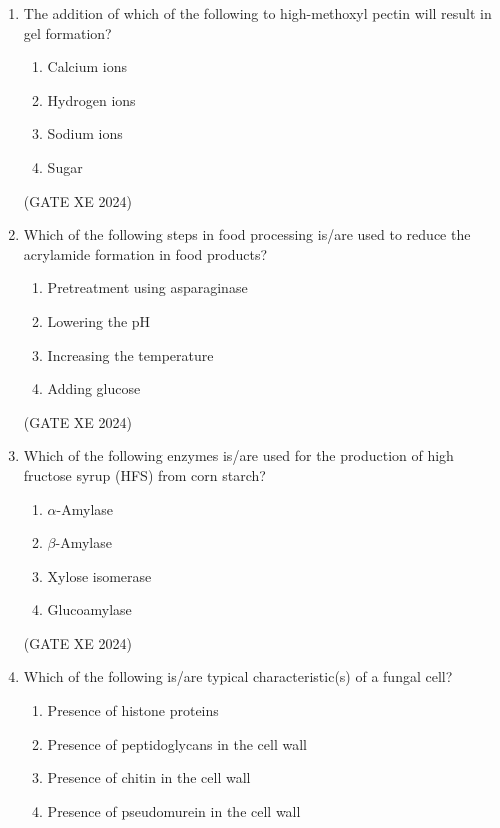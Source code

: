 \documentclass[12pt]{article}
\begin{document}
\begin{enumerate}
(GATE XE 2024)

\item The addition of which of the following to high-methoxyl pectin will result in gel formation?  

\begin{enumerate}
\item Calcium ions  
\item Hydrogen ions  
\item Sodium ions  
\item Sugar  
\end{enumerate}

(GATE XE 2024)

\item Which of the following steps in food processing is/are used to reduce the acrylamide formation in food products?  

\begin{enumerate}
\item Pretreatment using asparaginase  
\item Lowering the pH  
\item Increasing the temperature  
\item Adding glucose  
\end{enumerate}

(GATE XE 2024)

\item Which of the following enzymes is/are used for the production of high fructose syrup (HFS) from corn starch?

\begin{enumerate}
\item $\alpha$-Amylase  
\item $\beta$-Amylase  
\item Xylose isomerase  
\item Glucoamylase  
\end{enumerate}

(GATE XE 2024)

\item Which of the following is/are typical characteristic(s) of a fungal cell?

\begin{enumerate}
\item Presence of histone proteins  
\item Presence of peptidoglycans in the cell wall  
\item Presence of chitin in the cell wall  
\item Presence of pseudomurein in the cell wall  
\end{enumerate}


\end{enumerate}
\end{document}
